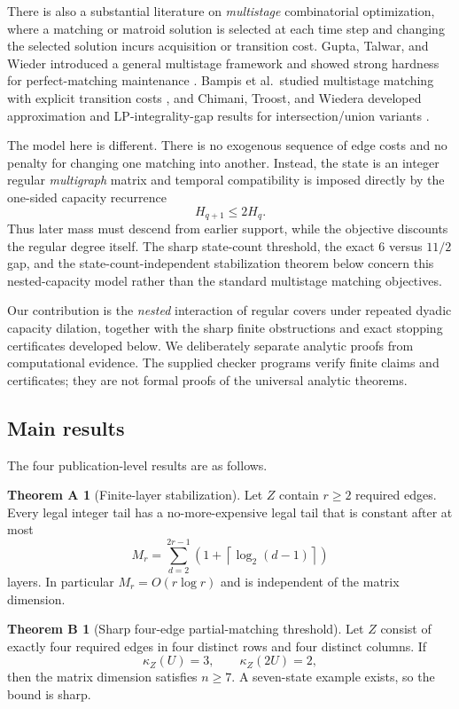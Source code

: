 \documentclass[11pt]{article}
\theoremstyle{definition}
\newtheorem*{theoremA}{Theorem A}
\newtheorem*{theoremB}{Theorem B}
\begin{document}
There is also a substantial literature on \emph{multistage} combinatorial optimization, where a
matching or matroid solution is selected at each time step and changing the selected solution
incurs acquisition or transition cost.  Gupta, Talwar, and Wieder introduced a general
multistage framework and showed strong hardness for perfect-matching maintenance
\cite{gupta2014changing}.  Bampis et al.\ studied multistage matching with explicit transition
costs \cite{bampis2018multistage}, and Chimani, Troost, and Wiedera developed approximation and
LP-integrality-gap results for intersection/union variants \cite{chimani2022approximating}.

The model here is different.  There is no exogenous sequence of edge costs and no penalty for
changing one matching into another.  Instead, the state is an integer regular \emph{multigraph}
matrix and temporal compatibility is imposed directly by the one-sided capacity recurrence
\[
H_{q+1}\le 2H_q .
\]
Thus later mass must descend from earlier support, while the objective discounts the regular
degree itself.  The sharp state-count threshold, the exact $6$ versus $11/2$ gap, and the
state-count-independent stabilization theorem below concern this nested-capacity model rather
than the standard multistage matching objectives.

Our contribution is the \emph{nested} interaction of regular covers under repeated dyadic
capacity dilation, together with the sharp finite obstructions and exact stopping certificates
developed below.  We deliberately separate analytic proofs from computational evidence.  The
supplied checker programs verify finite claims and certificates; they are not formal proofs of
the universal analytic theorems.

\subsection{Main results}

The four publication-level results are as follows.

\begin{theoremA}[Finite-layer stabilization]
Let $Z$ contain $r\ge2$ required edges.  Every legal integer tail has a no-more-expensive legal tail
that is constant after at most
\[
M_r
=
\sum_{d=2}^{2r-1}
\left(1+\left\lceil\log_2(d-1)\right\rceil\right)
\]
layers.  In particular $M_r=O(r\log r)$ and is independent of the matrix dimension.
\end{theoremA}

\begin{theoremB}[Sharp four-edge partial-matching threshold]
Let $Z$ consist of exactly four required edges in four distinct rows and four distinct columns.
If
\[
\kappa_Z(U)=3,
\qquad
\kappa_Z(2U)=2,
\]
then the matrix dimension satisfies $n\ge7$.  A seven-state example exists, so the bound is sharp.
\end{theoremB}
\end{document}
